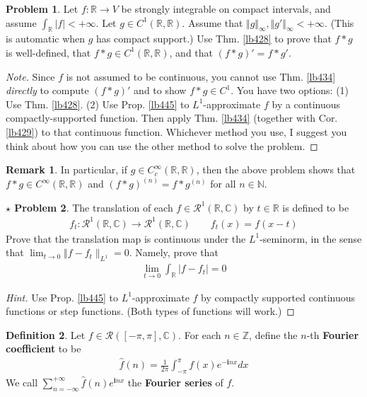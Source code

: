 \documentclass[12pt,b5paper,notitlepage]{article}
\theoremstyle{definition}
\newtheorem{df}{Definition}[section]
\newtheorem{rem}[df]{Remark}
\newtheorem{prob}{\color{red}Problem}[section]
\newtheorem{sprob}[prob]{\color{red}$\star$ Problem}
\theoremstyle{plain}
\newcommand{\wht}{\widehat}
\newcommand{\scr}{\mathscr}
\newcommand{\im}{\mathbf{i}}
\newcommand{\Cbb}{\mathbb C}
\newcommand{\Nbb}{\mathbb N}
\newcommand{\Zbb}{\mathbb Z}
\newcommand{\Rbb}{\mathbb R}
\newcommand{\dps}{\displaystyle}
\numberwithin{equation}{section}
\begin{document}
\begin{prob}\label{lb439}
Let $f:\Rbb\rightarrow V$ be strongly integrable on compact intervals, and assume $\int_\Rbb |f|<+\infty$. Let $g\in C^1(\Rbb,\Rbb)$. Assume that $\Vert g\Vert_\infty,\Vert g'\Vert_\infty<+\infty$. (This is automatic when $g$ has compact support.) Use Thm. \ref{lb428} to prove that $f*g$ is well-defined, that $f*g\in C^1(\Rbb,\Rbb)$, and that $(f*g)'=f*g'$.
\end{prob}

\begin{proof}[Note]
Since $f$ is not assumed to be continuous, you cannot use Thm. \ref{lb434} \textit{directly} to compute $(f*g)'$ and to show $f*g\in C^1$. You have two options: (1) Use Thm. \ref{lb428}. (2) Use Prop. \ref{lb445} to  $L^1$-approximate $f$ by a continuous compactly-supported function. Then apply Thm. \ref{lb434} (together with Cor. \ref{lb429}) to that continuous function. Whichever method you use, I suggest you think about how you can use the other method to solve the problem.
\end{proof}


\begin{rem}
In particular, if $g\in C_c^\infty(\Rbb,\Rbb)$, then the above problem shows that $f*g\in C^\infty(\Rbb,\Rbb)$ and $(f*g)^{(n)}=f*g^{(n)}$ for all $n\in\Nbb$.
\end{rem}



\begin{sprob}
The translation of each $f\in\scr R^1(\Rbb,\Cbb)$ by $t\in\Rbb$ is defined to be
\begin{align*}
f_t:\scr R^1(\Rbb,\Cbb)\rightarrow\scr R^1(\Rbb,\Cbb)\qquad f_t(x)=f(x-t)
\end{align*}
Prove that the translation map is continuous under the $L^1$-seminorm, in the sense that $\lim_{t\rightarrow0}\Vert f-f_t\lVert_{L^1}=0$. Namely, prove that
\begin{align*}
\lim_{t\rightarrow 0}\int_\Rbb |f-f_t|=0
\end{align*}
\end{sprob}

\begin{proof}[Hint]
Use Prop. \ref{lb445} to $L^1$-approximate $f$ by compactly supported continuous functions or step functions. (Both types of functions will work.)
\end{proof}


\begin{df}
Let $f\in\scr R([-\pi,\pi],\Cbb)$. For each $n\in\Zbb$, define the $n$-th \textbf{Fourier coefficient} \index{fn@$\wht f(n)$} to be
\begin{align*}
\wht f(n)=\frac 1{2\pi}\int_{-\pi}^\pi f(x)e^{-\im nx}dx
\end{align*}
We call $\dps \sum_{n=-\infty}^{+\infty}\wht f(n)e^{\im nx}$ the \textbf{Fourier series}  of $f$.
\end{df}
\end{document}
